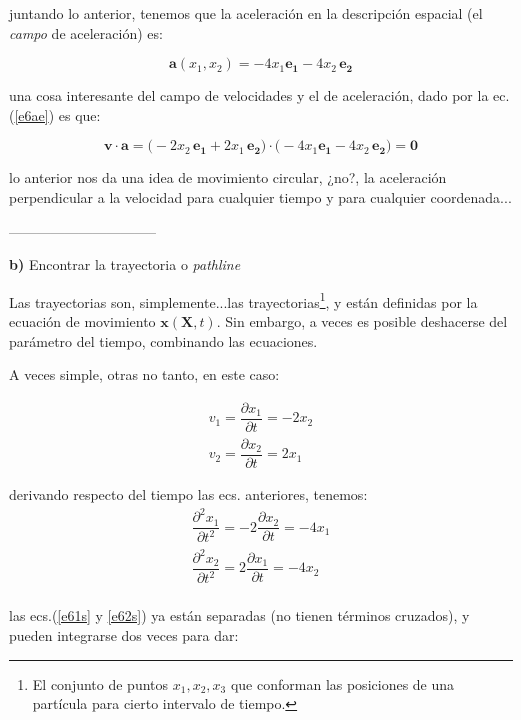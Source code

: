 \documentclass[10pt,a4paper]{article}
\begin{document}
\noindent juntando lo anterior, tenemos que la aceleración en la descripción espacial (el \textit{campo} de aceleración) es:

\begin{equation} \label{e6ae}
\mathbf{a}(x_1,x_2) = -4 x_1 \mathbf{e_1} - 4x_2 \, \mathbf{e_2}  
\end{equation}

\noindent una cosa interesante del campo de velocidades y el de aceleración, dado por la ec.(\ref{e6ae}) es que:


\begin{equation}\nonumber
\mathbf{v} \cdot \mathbf{a} = \Big(-2x_2\, \mathbf{e_1} + 2x_1 \, \mathbf{e_2} \Big) \cdot \Big(-4 x_1 \mathbf{e_1} - 4x_2 \, \mathbf{e_2}\Big) = \mathbf{0}
\end{equation}

\noindent lo anterior nos da una idea de movimiento circular, ¿no?, la aceleración perpendicular a la velocidad para cualquier tiempo y para cualquier coordenada...


--------------------------------


\textbf{b)} Encontrar la trayectoria o \textit{pathline}

Las trayectorias son, simplemente...las trayectorias\footnote{El conjunto de puntos $x_1, x_2, x_3$ que conforman las posiciones de una partícula para cierto intervalo de tiempo.}, y están definidas por la ecuación de movimiento $\mathbf{x}(\mathbf{X}, t)$. Sin embargo, a veces es posible deshacerse del parámetro del tiempo, combinando las ecuaciones.

A veces simple, otras no tanto, en este caso:


\begin{eqnarray}
\label{e61} v_1 = \dfrac{\partial x_1}{\partial t}  = -2 x_2  \\
\label{e62}v_2 = \dfrac{\partial x_2}{\partial t} = 2 x_1 \
\end{eqnarray}




\noindent derivando respecto del tiempo las ecs. anteriores, tenemos:
\begin{eqnarray}
\label{e61s}\dfrac{\partial^2 x_1}{\partial t^2}  = -2 \dfrac{\partial x_2}{\partial t} = -4x_1 \\
\label{e62s}\dfrac{\partial^2 x_2}{\partial t^2}  = 2 \dfrac{\partial x_1}{\partial t} = -4x_2 \\
\end{eqnarray}

\noindent las ecs.(\ref{e61s} y \ref{e62s}) ya están separadas (no tienen términos cruzados), y pueden integrarse dos veces para dar:
\end{document}
